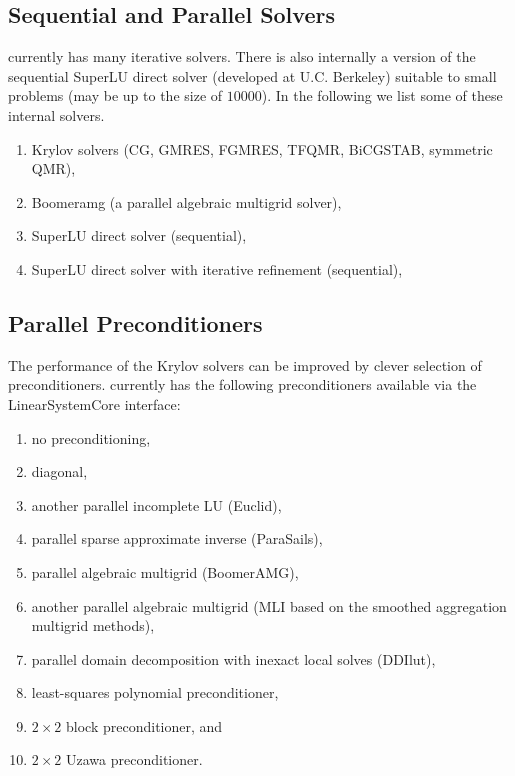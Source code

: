 \subsection{Sequential and Parallel Solvers} 

\hypre{} currently has many iterative solvers. There is also internally a
version of the sequential {\sf SuperLU} direct solver (developed at U.C.
Berkeley) suitable to small problems (may be up to the size of $10000$).
In the following we list some of these internal solvers.

\begin{enumerate}
\item Krylov solvers (CG, GMRES, FGMRES, TFQMR, BiCGSTAB, symmetric QMR),
\item Boomeramg (a parallel algebraic multigrid solver),
\item SuperLU direct solver (sequential),
\item SuperLU direct solver with iterative refinement (sequential), 
\end{enumerate}

\subsection{Parallel Preconditioners} 

The performance of the Krylov solvers can be improved by clever selection
of preconditioners. \hypre{} currently has the following preconditioners 
available via the {\sf LinearSystemCore} interface: 

\begin{enumerate}
\item no preconditioning,
\item diagonal, 
\item another parallel incomplete LU ({\sf Euclid}),
\item parallel sparse approximate inverse ({\sf ParaSails}),
\item parallel algebraic multigrid ({\sf BoomerAMG}),
\item another parallel algebraic multigrid ({\sf MLI} based on
the smoothed aggregation multigrid methods),
\item parallel domain decomposition with inexact local solves ({\sf DDIlut}), 
\item least-squares polynomial preconditioner,
\item $2 \times 2$ block preconditioner, and
\item $2 \times 2$ Uzawa preconditioner.
\end{enumerate}

